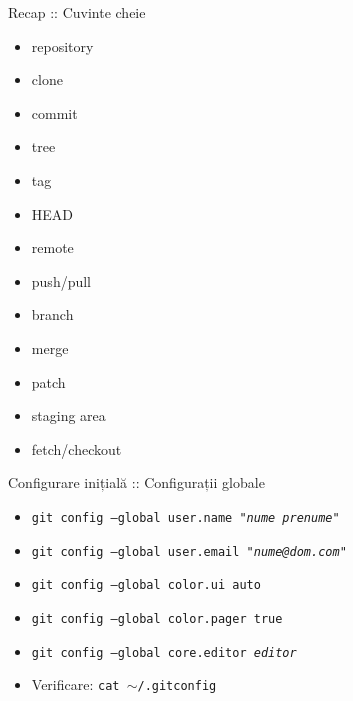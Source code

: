 \documentclass{beamer}
\begin{document}
\begin{frame}{Recap :: Cuvinte cheie}
  \begin{itemize}
    \item repository
    \item clone
    \item commit
    \item tree
    \item tag
    \item HEAD
    \item remote
    \item push/pull
    \item branch
    \item merge
    \item patch
    \item staging area
    \item fetch/checkout
  \end{itemize}
\end{frame}

\begin{frame}{Configurare inițială :: Configurații globale}
  \begin{itemize}
    \item \texttt{git config --global user.name "\textit{nume prenume}"}
    \item \texttt{git config --global user.email "\textit{nume@dom.com}"}
    \item \texttt{git config --global color.ui auto}
    \item \texttt{git config --global color.pager true}
    \item \texttt{git config --global core.editor \textit{editor}}
  \end{itemize}
  \begin{itemize}
    \item Verificare: \texttt{cat $\sim$/.gitconfig}
  \end{itemize}
\end{frame}
\end{document}
